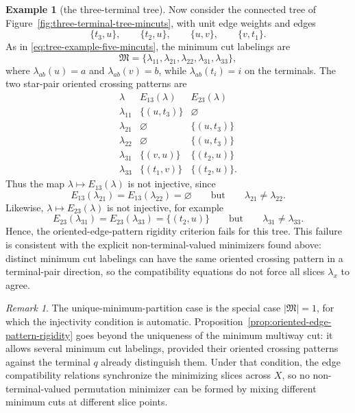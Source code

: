 \documentclass[11pt,oneside,letterpaper]{article}
\numberwithin{equation}{section}
\theoremstyle{definition}
\newtheorem{example}[theorem]{Example}
\theoremstyle{remark}
\newtheorem{remark}[theorem]{Remark}
\begin{document}
\begin{example}[the three-terminal tree]
Now consider the connected tree of Figure~\ref{fig:three-terminal-tree-mincuts},
with unit edge weights and edges
\begin{equation}
  \{t_3,u\},\qquad \{t_2,u\},\qquad \{u,v\},\qquad \{v,t_1\}.
\end{equation}
As in \eqref{eq:tree-example-five-mincuts}, the minimum cut labelings
are
\begin{equation}
  \mathfrak{M}
  =
  \{\lambda_{11},\lambda_{21},\lambda_{22},\lambda_{31},\lambda_{33}\},
\end{equation}
where $\lambda_{ab}(u)=a$ and $\lambda_{ab}(v)=b$, while
$\lambda_{ab}(t_i)=i$ on the terminals.  The two star-pair oriented
crossing patterns are
\begin{equation}
\begin{array}{c|c|c}
\lambda & E_{13}(\lambda) & E_{23}(\lambda)\\
\hline
\lambda_{11} & \{(u,t_3)\} & \varnothing\\
\lambda_{21} & \varnothing & \{(u,t_3)\}\\
\lambda_{22} & \varnothing & \{(u,t_3)\}\\
\lambda_{31} & \{(v,u)\} & \{(t_2,u)\}\\
\lambda_{33} & \{(t_1,v)\} & \{(t_2,u)\}.
\end{array}
\end{equation}
Thus the map $\lambda\mapsto E_{13}(\lambda)$ is not injective, since
\begin{equation}
  E_{13}(\lambda_{21})=E_{13}(\lambda_{22})=\varnothing
  \qquad\text{but}\qquad
  \lambda_{21}\ne\lambda_{22}.
\end{equation}
Likewise, $\lambda\mapsto E_{23}(\lambda)$ is not injective, for
example
\begin{equation}
  E_{23}(\lambda_{31})=E_{23}(\lambda_{33})=\{(t_2,u)\}
  \qquad\text{but}\qquad
  \lambda_{31}\ne\lambda_{33}.
\end{equation}
Hence, the oriented-edge-pattern rigidity criterion fails for this tree.
This failure is consistent with the explicit non-terminal-valued
minimizers found above: distinct minimum cut labelings can have the
same oriented crossing pattern in a terminal-pair direction, so the
compatibility equations do not force all slices $\lambda_x$ to agree.
\end{example}

\begin{remark}
The unique-minimum-partition case is the special case $|\mathfrak{M}|=1$, for which the injectivity condition is automatic. Proposition~\ref{prop:oriented-edge-pattern-rigidity} goes beyond the uniqueness of the minimum multiway cut: it allows several minimum cut labelings, provided their oriented crossing patterns against the terminal $q$ already distinguish them.  Under that condition, the edge compatibility relations synchronize the minimizing slices across $X$, so no non-terminal-valued permutation minimizer can be formed by mixing different minimum cuts at different slice points.
\end{remark}
\end{document}
